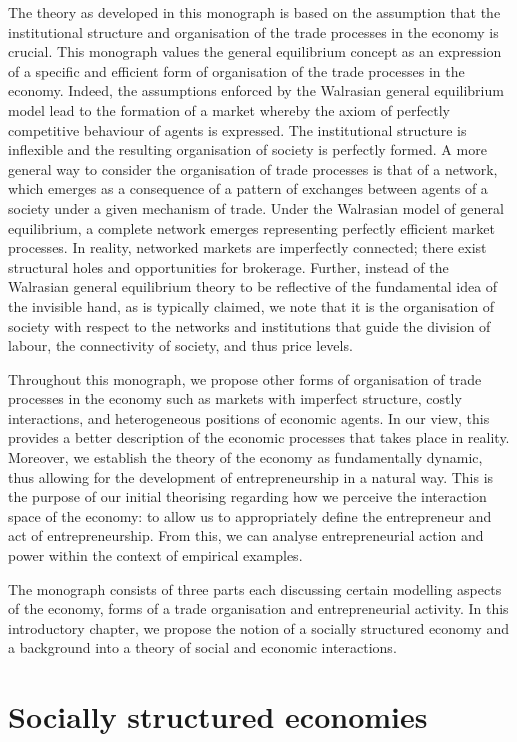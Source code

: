 The theory as developed in this monograph is based on the assumption that the institutional structure and organisation of the trade processes in the economy is crucial. This monograph values the general equilibrium concept as an expression of a specific and efficient form of organisation of the trade processes in the economy. Indeed, the assumptions enforced by the Walrasian general equilibrium model lead to the formation of a market whereby the axiom of perfectly competitive behaviour of agents is expressed. The institutional structure is inflexible and the resulting organisation of society is perfectly formed. A more general way to consider the organisation of trade processes is that of a network, which emerges as a consequence of a pattern of exchanges between agents of a society under a given mechanism of trade. Under the Walrasian model of general equilibrium, a complete network emerges representing perfectly efficient market processes. In reality, networked markets are imperfectly connected; there exist structural holes and opportunities for brokerage. Further, instead of the Walrasian general equilibrium theory to be reflective of the fundamental idea of the invisible hand, as is typically claimed, we note that it is the organisation of society with respect to the networks and institutions that guide the division of labour, the connectivity of society, and thus price levels.

Throughout this monograph, we propose other forms of organisation of trade processes in the economy such as markets with imperfect structure, costly interactions, and heterogeneous positions of economic agents. In our view, this provides a better description of the economic processes that takes place in reality. Moreover, we establish the theory of the economy as fundamentally dynamic, thus allowing for the development of entrepreneurship in a natural way. This is the purpose of our initial theorising regarding how we perceive the interaction space of the economy: to allow us to appropriately define the entrepreneur and act of entrepreneurship. From this, we can analyse entrepreneurial action and power within the context of empirical examples.

The monograph consists of three parts each discussing certain modelling aspects of the economy, forms of a trade organisation and entrepreneurial activity. In this introductory chapter, we propose the notion of a socially structured economy and a background into a theory of social and economic interactions.

\section{Socially structured economies}


